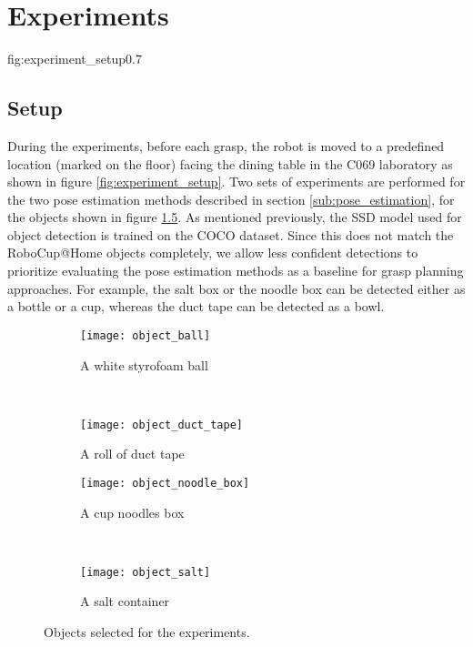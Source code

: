 
\chapter{Experiments}

             {fig:experiment_setup}{0.7\textwidth}


\section{Setup}

During the experiments, before each grasp, the robot is moved to a predefined location (marked on the floor) facing the
dining table in the C069 laboratory as shown in figure \ref{fig:experiment_setup}. Two sets of experiments are performed
for the two pose estimation methods described in section \ref{sub:pose_estimation}, for the objects shown in figure
\ref{fig:objects}. As mentioned previously, the SSD model used for object detection is trained on the COCO dataset.
Since this does not match the RoboCup@Home objects completely, we allow less confident detections to prioritize
evaluating the pose estimation methods as a baseline for grasp planning approaches. For example, the salt box or the
noodle box can be detected either as a bottle or a cup, whereas the duct tape can be detected as a bowl.

\begin{figure}[h!]
    \centering
    \small
    \begin{subfigure}[b]{0.4\textwidth}
        \texttt{[image: object\_ball]}
        \caption{A white styrofoam ball}
        \label{fig:object_ball}
    \end{subfigure}
    ~
    \begin{subfigure}[b]{0.4\textwidth}
        \texttt{[image: object\_duct\_tape]}
        \caption{A roll of duct tape}
        \label{fig:object_duct_tape}
    \end{subfigure}

    \begin{subfigure}[b]{0.4\textwidth}
        \texttt{[image: object\_noodle\_box]}
        \caption{A cup noodles box}
        \label{fig:object_noodle_box}
    \end{subfigure}
    ~
    \begin{subfigure}[b]{0.4\textwidth}
        \texttt{[image: object\_salt]}
        \caption{A salt container}
        \label{fig:object_salt}
    \end{subfigure}
    \caption{Objects selected for the experiments.}\label{fig:objects}
\end{figure}

